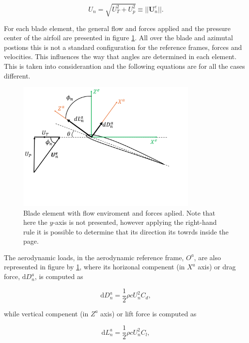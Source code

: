 \begin{equation}
    U_n = \sqrt{U_T^2 + U_p^2} \equiv || \mathbf{U}_n^e ||.
    \label{eq:result_vel_norm}
\end{equation}

For each blade element, the general flow and forces applied and the pressure center of the airfoil are presented in figure \ref{fig:element_bet}. All over the blade and azimutal postions this is not a standard configuration for the reference frames, forces and velocities. This influences the way that angles are determined in each element. This is taken into considerantion and the following equations are for all the cases different.

\begin{figure}[!htb]
    \centering
    \includegraphics[width=9cm]{Figures/background/bet/element.png}
    \caption{Blade element with flow enviroment and forces aplied. Note that here the $y$-axis is not presented, however applying the right-hand rule it is possible to determine that its direction its towrds inside the page.}
    \label{fig:element_bet}
\end{figure}

The aerodynamic loads, in the aerodynamic reference frame, $O^a$, are also represented in figure by \ref{fig:element_bet}, where its horizonal compenent (in $X^a$ axis) or drag force, $\mathrm{d}D_n^a$, is computed as

\begin{equation}
    \mathrm{d}D^a_n = \frac{1}{2} \rho c U_n^2 C_d,
    \label{eq:drag_element}
\end{equation}

\noindent while vertical compenent (in $Z^a$ axis) or lift force is computed as

\begin{equation}
    \mathrm{d}L^a_n = \frac{1}{2} \rho c U_n^2 C_l,
    \label{eq:lift_element}
\end{equation}

